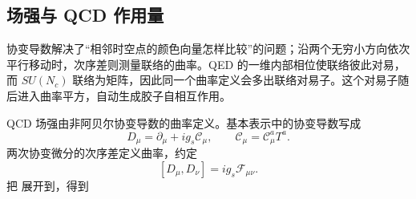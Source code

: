 \subsection{场强与 QCD 作用量}

协变导数解决了“相邻时空点的颜色向量怎样比较”的问题；沿两个无穷小方向依次平行移动时，次序差则测量联络的曲率。QED 的一维内部相位使联络彼此对易，而 $SU(N_c)$ 联络为矩阵，因此同一个曲率定义会多出联络对易子。这个对易子随后进入曲率平方，自动生成胶子自相互作用。

QCD 场强由非阿贝尔协变导数的曲率定义。基本表示中的协变导数写成
\begin{equation}
{
D_\mu=\partial_\mu+i g_s\mathscr C_\mu,
\qquad
\mathscr C_\mu=\mathscr C_\mu^aT^a.}
\label{eq:qcd-covariant-derivative-dp68}
\end{equation}
两次协变微分的次序差定义曲率，约定
\begin{equation}
{
[D_\mu,D_\nu]=i g_s\mathcal F_{\mu\nu}.}
\label{eq:qcd-curvature-definition-dp68}
\end{equation}
把 展开到，得到


